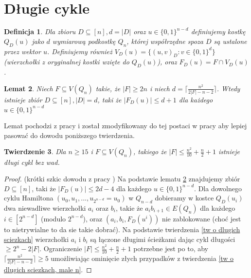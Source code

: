 \documentclass{pracamgr}
\newtheorem{theorem}{Twierdzenie}[chapter]
\newtheorem{defi}[theorem]{Definicja}
\newtheorem{lemma}[theorem]{Lemat}
\begin{document}
  \section{Długie cykle}
   \begin{defi}\label{przekrój kostki}
    Dla zbioru $D\subseteq[n], d=|D|$ oraz $u\in\{0,1\}^{n-d}$ definiujemy kostkę $Q_D(u)$ jako $d$ wymiarową podkostkę $Q_n$, której współrzędne spoza $D$
    są ustalone przez wektor $u$. Definiujemy również $V_D(u)=\{(u,v)_D:v\in\{0,1\}^d\}$ (wierzchołki z oryginalnej kostki wzięte do $Q_D(u)$), oraz
    $F_D(u)=F\cap V_D(u)$.
   \end{defi}
   \begin{lemma}\label{dlugi cykl - podzial kostki}
    Niech $F\subseteq V(Q_n)$ takie, że $|F|\ge 2n$ i niech $d=\lceil\frac{n^2}{2|F|-n-2}\rceil$.
    Wtedy istnieje zbiór $D\subseteq[n],|D|=d$, taki że $|F_D(u)|\le d+1$ dla każdego $u\in\{0,1\}^{n-d}$
   \end{lemma}
   Lemat pochodzi z pracy \cite{Wie} i został zmodyfikowany do tej postaci w pracy \cite{FG} aby lepiej pasować do dowodu poniższego twierdzenia.
   \begin{theorem}\label{dlugi cykl - tw}
    Dla $n\ge15$ i $F\subseteq V(Q_n)$, takiego że $|F|\le\frac{n^2}{10}+\frac{n}{2}+1$ istnieje długi cykl bez wad.
   \end{theorem}
   \begin{proof}
    (krótki szkic dowodu z pracy \cite{FG})\newline
    Na podstawie lematu \ref{dlugi cykl - podzial kostki} znajdujemy zbiór $D\subseteq[n]$, taki że $|F_D(u)|\le 2d-4$ dla każdego $u\in\{0,1\}^{n-d}$.
    Dla dowolnego cyklu Hamiltona $(u_0,u_1,...,u_{2^{n-d}}=u_0)$ w $Q_{n-d}$ dobieramy w kostce $Q_D(u_i)$ dwa niewadliwe
    wierzchołki $a_i$ oraz $b_i$, takie że $a_ib_{i+1}\in E(Q_n)$ dla każdego $i\in[2^{n-d}]$ (modulo $2^{n-d}$),
    oraz $(a_i,b_i,F_D(u^i))$ nie zablokowane (choć jest to nietrywialne to da sie takie dobrać).
    Na podstawie twierdzenia \ref{tw o dlugich sciezkach} wierzchołki $a_i$ i $b_i$ są łączone długimi ścieżkami dając cykl długości $\ge 2^n-2|F|$.
    Ograniczenie $|F|\le\frac{n^2}{10}+\frac{n}{2}+1$ potrzebne jest po to, aby $\lceil\frac{n^2}{2|F|-n-2}\rceil\ge5$ umożliwiając ominięcie złych
    przypadków z twierdzenia \ref{tw o dlugich sciezkach, male n}.
   \end{proof}
\end{document}

